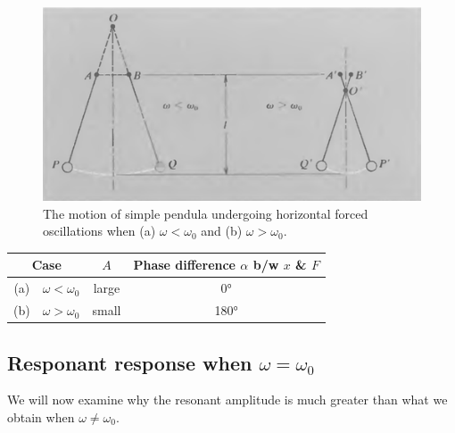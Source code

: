 \begin{figure}[h]
	\centering
	\includegraphics[scale=0.7]{phys232/Ch4-forced-no-damping-pendula.png} 
	\caption{The motion of simple pendula undergoing horizontal forced oscillations when (a) $\omega<\omega_0$ and (b) $\omega>\omega_0$.}\label{ch4:no-damping-pendula}
\end{figure}

\begin{center}
\begin{tabular}{cccc}
	\hline
	\multicolumn{2}{c}{Case} & $A$ & \parbox{3cm}{\centering Phase difference $\alpha$ b/w $x$ \& $F$}  \\
	\hline\hline
	(a) & $\omega < \omega_0$ & large & 0° \\
	(b) & $\omega > \omega_0$ & small & 180° \\
	\hline
\end{tabular}
\end{center}


\subsection{Responant response when $\omega = \omega_0$}

We will now examine why the resonant amplitude is much greater than what we obtain when $\omega\neq \omega_0$.

